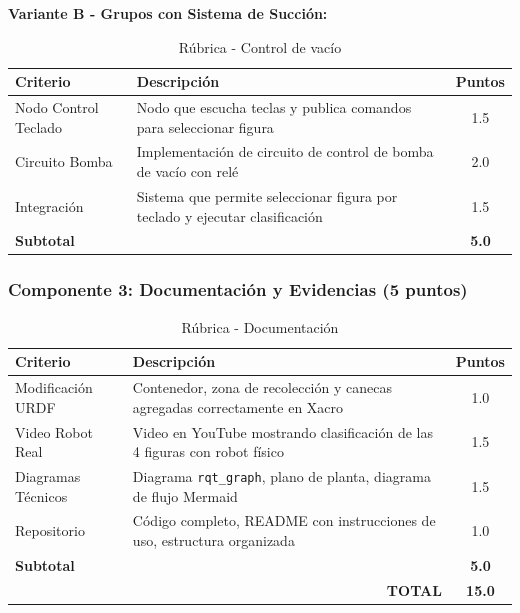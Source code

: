 \textbf{Variante B - Grupos con Sistema de Succión:}

\begin{table}[H]
\centering
\caption{Rúbrica - Control de vacío}
\label{tab:rubrica_vacio}
\footnotesize
\begin{tabular}{|l|p{10cm}|c|}
\hline
\textbf{Criterio} & \textbf{Descripción} & \textbf{Puntos} \\
\hline
Nodo Control Teclado & Nodo que escucha teclas y publica comandos para seleccionar figura & 1.5 \\
\hline
Circuito Bomba & Implementación de circuito de control de bomba de vacío con relé & 2.0 \\
\hline
Integración & Sistema que permite seleccionar figura por teclado y ejecutar clasificación & 1.5 \\
\hline
\textbf{Subtotal} & & \textbf{5.0} \\
\hline
\end{tabular}
\end{table}

\subsubsection{Componente 3: Documentación y Evidencias (5 puntos)}

\begin{table}[H]
\centering
\caption{Rúbrica - Documentación}
\label{tab:rubrica_doc}
\footnotesize
\begin{tabular}{|l|p{10cm}|c|}
\hline
\textbf{Criterio} & \textbf{Descripción} & \textbf{Puntos} \\
\hline
Modificación URDF & Contenedor, zona de recolección y canecas agregadas correctamente en Xacro & 1.0 \\
\hline
Video Robot Real & Video en YouTube mostrando clasificación de las 4 figuras con robot físico & 1.5 \\
\hline
Diagramas Técnicos & Diagrama \texttt{rqt\_graph}, plano de planta, diagrama de flujo Mermaid & 1.5 \\
\hline
Repositorio & Código completo, README con instrucciones de uso, estructura organizada & 1.0 \\
\hline
\textbf{Subtotal} & & \textbf{5.0} \\
\hline
\multicolumn{2}{|r|}{\textbf{TOTAL}} & \textbf{15.0} \\
\hline
\end{tabular}
\end{table}

